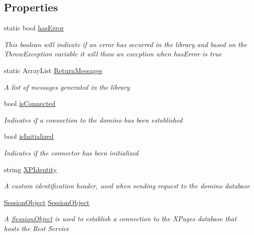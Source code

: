 \subsection*{Properties}
\begin{DoxyCompactItemize}
\item 
static bool \hyperlink{class_connector_a079bae21a5417efa53bfe8954c0f533f}{has\+Error}
\begin{DoxyCompactList}\small\item\em This boolean will indicate if an error has occurred in the library and based on the Throw\+Exception variable it will thow an execption when has\+Error is true \end{DoxyCompactList}\item 
static Array\+List \hyperlink{class_connector_a1ed422674b344524fd77998dcf6a9ba6}{Return\+Messages}
\begin{DoxyCompactList}\small\item\em A list of messages generated in the library \end{DoxyCompactList}\item 
bool \hyperlink{class_connector_acf2c3b519c360d02ed54543a01d199af}{is\+Connected}
\begin{DoxyCompactList}\small\item\em Indicates if a connection to the domino has been established \end{DoxyCompactList}\item 
bool \hyperlink{class_connector_a017d40b1f4cf2cbaa5d4b755cf09269e}{is\+Initialized}
\begin{DoxyCompactList}\small\item\em Indicates if the connector has been initialized \end{DoxyCompactList}\item 
string \hyperlink{class_connector_a092e3e36f92c129c07c57df9b8fb91ca}{X\+P\+Identity}
\begin{DoxyCompactList}\small\item\em A custom identification header, used when sending request to the domino database \end{DoxyCompactList}\item 
\hyperlink{class_session_object}{Session\+Object} \hyperlink{class_connector_a0a7bb42f9530796c086ab50785147ce9}{Session\+Object}
\begin{DoxyCompactList}\small\item\em A \hyperlink{class_session_object}{Session\+Object} is used to establish a connection to the X\+Pages database that hosts the Rest Service \end{DoxyCompactList}\end{DoxyCompactItemize}


